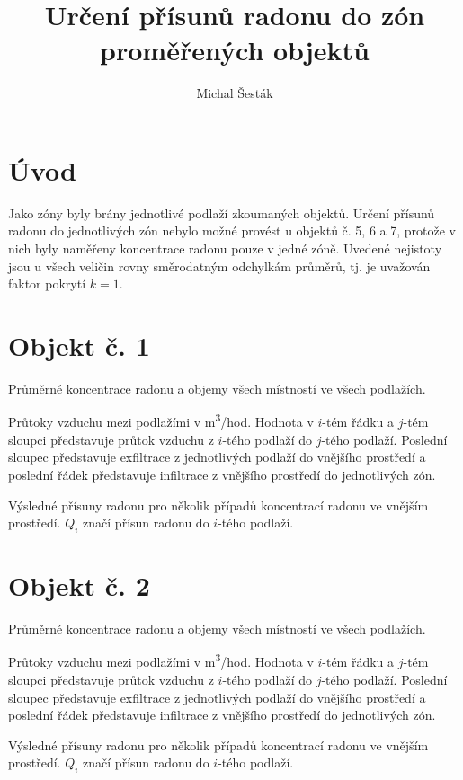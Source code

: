 \documentclass[11pt,a4paper]{article}
\author{Michal Šesták}
\title{Určení přísunů radonu do zón proměřených objektů}
\begin{document}
\maketitle
\tableofcontents
\section{Úvod}
Jako zóny byly brány jednotlivé podlaží zkoumaných objektů. Určení přísunů radonu do jednotlivých zón nebylo možné provést u objektů č. 5, 6 a 7, protože v nich byly naměřeny koncentrace radonu pouze v jedné zóně. Uvedené nejistoty jsou u všech veličin rovny směrodatným odchylkám průměrů, tj. je uvažován faktor pokrytí $k=1$.
\section{Objekt č. 1}
\begin{table}[H]
    \centering
    \caption{Průměrné koncentrace radonu a objemy všech místností ve všech podlažích.}
    
\end{table}
\begin{table}[H]
    \centering
    \caption{Průtoky vzduchu mezi podlažími v \si{m^3/hod}. Hodnota v $i$-tém řádku a $j$-tém sloupci představuje průtok vzduchu z $i$-tého podlaží do $j$-tého podlaží. Poslední sloupec představuje exfiltrace z jednotlivých podlaží do vnějšího prostředí a poslední řádek představuje infiltrace z vnějšího prostředí do jednotlivých zón.}
    
\end{table}
\begin{table}[H]
    \centering
    \caption{Výsledné přísuny radonu pro několik případů koncentrací radonu ve vnějším prostředí. $Q_i$ značí přísun radonu do $i$-tého podlaží.}
    
\end{table}

\section{Objekt č. 2}
\begin{table}[H]
    \centering
    \caption{Průměrné koncentrace radonu a objemy všech místností ve všech podlažích.}
    
\end{table}
\begin{table}[H]
    \centering
    \caption{Průtoky vzduchu mezi podlažími v \si{m^3/hod}. Hodnota v $i$-tém řádku a $j$-tém sloupci představuje průtok vzduchu z $i$-tého podlaží do $j$-tého podlaží. Poslední sloupec představuje exfiltrace z jednotlivých podlaží do vnějšího prostředí a poslední řádek představuje infiltrace z vnějšího prostředí do jednotlivých zón.}
    
\end{table}
\begin{table}[H]
    \centering
    \caption{Výsledné přísuny radonu pro několik případů koncentrací radonu ve vnějším prostředí. $Q_i$ značí přísun radonu do $i$-tého podlaží.}
    
\end{table}
\end{document}
